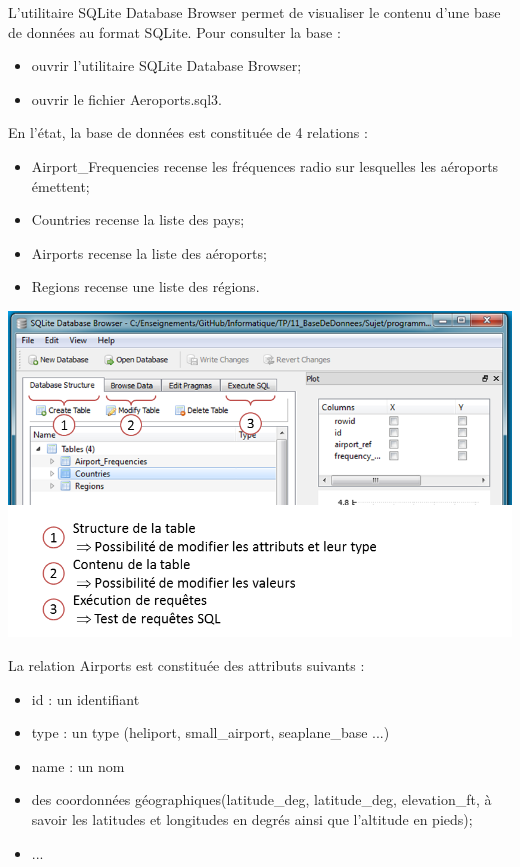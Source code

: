 \documentclass[10pt]{article}
\begin{document}
\begin{minipage}[c]{.5\linewidth}
L'utilitaire SQLite Database Browser permet de visualiser le contenu d'une base de données au format SQLite. Pour consulter la base :

\begin{itemize}%
\item ouvrir l'utilitaire SQLite Database Browser;
\item ouvrir le fichier \textsf{Aeroports.sql3}.
\end{itemize}



En l'état, la base de données est constituée de 4 relations : 
\begin{itemize}
\item \textsf{Airport\_Frequencies} recense les fréquences radio sur lesquelles les aéroports émettent;
\item \textsf{Countries} recense la liste des pays;
\item \textsf{Airports} recense la liste des aéroports;
\item \textsf{Regions} recense une liste des régions.
\end{itemize}
\end{minipage} \hfill
\begin{minipage}[c]{.5\linewidth}
\begin{center}
\includegraphics[width=.97\linewidth]{images/SQLBrowser}
\end{center}
\end{minipage}

La relation \textsf{Airports} est constituée des attributs suivants : 
\begin{itemize}
\item \textsf{id} : un identifiant
\item \textsf{type} : un type (heliport, small\_airport, seaplane\_base ...)
\item \textsf{name} : un nom
\item des coordonnées géographiques(\textsf{latitude\_deg}, \textsf{latitude\_deg}, \textsf{elevation\_ft}, à savoir les latitudes et longitudes en degrés ainsi que l'altitude en pieds);
\item ...
\end{itemize}
\fi
\end{document}
